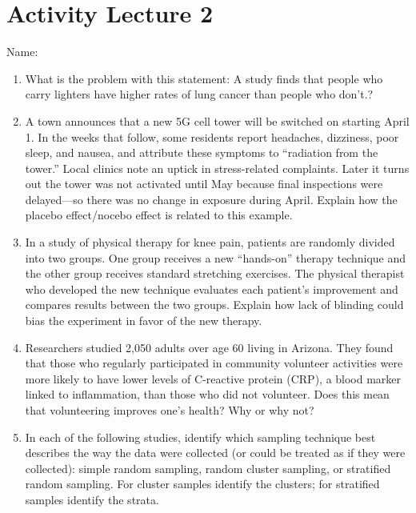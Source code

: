 \documentclass[
  letterpaper,
  DIV=11,
  numbers=noendperiod]{scrreprt}
\begin{document}
\chapter{Activity Lecture 2}\label{sec-week2}

Name:

\begin{enumerate}
\def\labelenumi{\arabic{enumi}.}
\item
  What is the problem with this statement: A study finds that people who
  carry lighters have higher rates of lung cancer than people who
  don't.?
\item
  A town announces that a new 5G cell tower will be switched on starting
  April 1. In the weeks that follow, some residents report headaches,
  dizziness, poor sleep, and nausea, and attribute these symptoms to
  ``radiation from the tower.'' Local clinics note an uptick in
  stress-related complaints. Later it turns out the tower was not
  activated until May because final inspections were delayed---so there
  was no change in exposure during April. Explain how the placebo
  effect/nocebo effect is related to this example.
\item
  In a study of physical therapy for knee pain, patients are randomly
  divided into two groups. One group receives a new ``hands-on'' therapy
  technique and the other group receives standard stretching exercises.
  The physical therapist who developed the new technique evaluates each
  patient's improvement and compares results between the two groups.
  Explain how lack of blinding could bias the experiment in favor of the
  new therapy.
\item
  Researchers studied 2,050 adults over age 60 living in Arizona. They
  found that those who regularly participated in community volunteer
  activities were more likely to have lower levels of C-reactive protein
  (CRP), a blood marker linked to inflammation, than those who did not
  volunteer. Does this mean that volunteering improves one's health? Why
  or why not?
\item
  In each of the following studies, identify which sampling technique
  best describes the way the data were collected (or could be treated as
  if they were collected): simple random sampling, random cluster
  sampling, or stratified random sampling. For cluster samples identify
  the clusters; for stratified samples identify the strata.
\end{enumerate}
\end{document}
